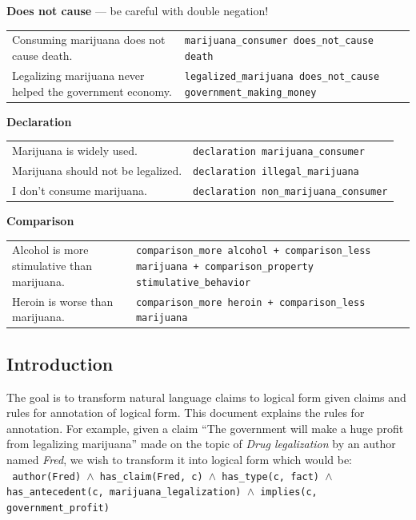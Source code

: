 \noindent \textbf{Does not cause} --- be careful with double negation! \\
\begin{tabular}{p{8cm} p{8cm}}
	Consuming marijuana does not cause death. & \texttt{marijuana\_consumer does\_not\_cause death} \\
	Legalizing marijuana never helped the government economy. & \texttt{legalized\_marijuana does\_not\_cause government\_making\_money}
\end{tabular}

\noindent \textbf{Declaration} \\
\begin{tabular}{p{8cm} p{8cm}}
	Marijuana is widely used. & \texttt{declaration marijuana\_consumer}  \\
	Marijuana should not be legalized. & \texttt{declaration illegal\_marijuana} \\
	I don’t consume marijuana.  & \texttt{declaration non\_marijuana\_consumer}
\end{tabular}

\noindent \textbf{Comparison} \\
\begin{tabular}{p{8cm} p{8cm}}
	Alcohol is more stimulative than marijuana. & \texttt{comparison\_more alcohol + comparison\_less marijuana + comparison\_property stimulative\_behavior}\\
	Heroin is worse than marijuana. & \texttt{comparison\_more heroin + comparison\_less marijuana}
\end{tabular}

\subsection*{Introduction}

The goal is to transform natural language claims to logical form given claims
and rules for annotation of logical form. This document explains the rules for
annotation. For example, given a claim ``The government will make a huge profit
from legalizing marijuana'' made on the topic of \textit{Drug legalization} by an author
named \textit{Fred}, we wish to transform it into logical form which would be: \\

\noindent \texttt{
author(Fred) $\wedge$ has\_claim(Fred, c) $\wedge$ has\_type(c, fact) 
$\wedge$ has\_antecedent(c, marijuana\_legalization) 
$\wedge$ implies(c, government\_profit)
} \\

